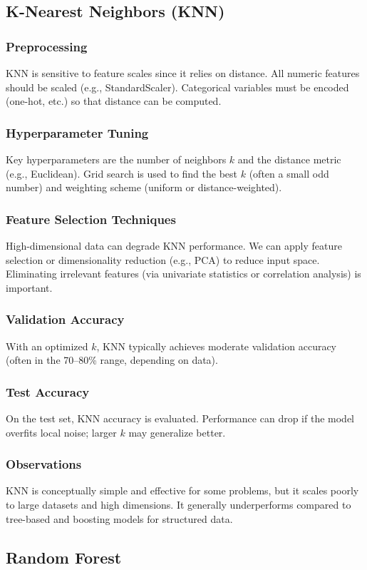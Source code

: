 \documentclass[12pt]{article}
\begin{document}
\subsection{K-Nearest Neighbors (KNN)}
\subsubsection{Preprocessing}
KNN is sensitive to feature scales since it relies on distance. All numeric features should be scaled (e.g., StandardScaler). Categorical variables must be encoded (one-hot, etc.) so that distance can be computed.
\subsubsection{Hyperparameter Tuning}
Key hyperparameters are the number of neighbors $k$ and the distance metric (e.g., Euclidean). Grid search is used to find the best $k$ (often a small odd number) and weighting scheme (uniform or distance-weighted).
\subsubsection{Feature Selection Techniques}
High-dimensional data can degrade KNN performance. We can apply feature selection or dimensionality reduction (e.g., PCA) to reduce input space. Eliminating irrelevant features (via univariate statistics or correlation analysis) is important.
\subsubsection{Validation Accuracy}
With an optimized $k$, KNN typically achieves moderate validation accuracy (often in the 70--80\% range, depending on data).
\subsubsection{Test Accuracy}
On the test set, KNN accuracy is evaluated. Performance can drop if the model overfits local noise; larger $k$ may generalize better.
\subsubsection{Observations}
KNN is conceptually simple and effective for some problems, but it scales poorly to large datasets and high dimensions. It generally underperforms compared to tree-based and boosting models for structured data.

\subsection{Random Forest}
\end{document}
